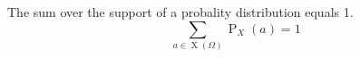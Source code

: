 The sum over the support of a probality distribution equals 1.
$$\sum\limits_{a \in \operatorname{X}(\Omega)} \operatorname{P}_{X}(a) = 1$$ 
